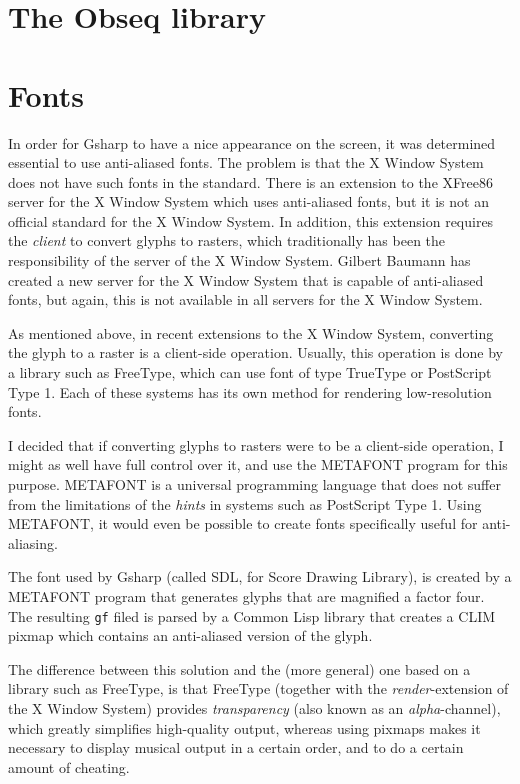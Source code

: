 \documentclass[11pt]{book}
\def\commonlisp{Common Lisp}
\def\gs{Gsharp}
\def\obseq{Obseq}
\def\clim{CLIM}
\def\xwin{the X Window System}
\def\freetype{FreeType}
\def\metafont{METAFONT}
\begin{document}
\chapter{The {\obseq} library}

\chapter{Fonts}
\label{chap-fonts}

In order for {\gs} to have a nice appearance on the screen, it was
determined essential to use anti-aliased fonts.  The problem is that
{\xwin} does not have such fonts in the standard.  There is an
extension to the XFree86 server for {\xwin} which uses anti-aliased
fonts, but it is not an official standard for {\xwin}.  In addition,
this extension requires the \emph{client} to convert glyphs to
rasters, which traditionally has been the responsibility of the server
of {\xwin}.  Gilbert Baumann has created a new server for {\xwin} that
is capable of anti-aliased fonts, but again, this is not available in
all servers for {\xwin}.

As mentioned above, in recent extensions to {\xwin}, converting the
glyph to a raster is a client-side operation.  Usually, this operation
is done by a library such as {\freetype}, which can use font of type
TrueType or PostScript Type 1.  Each of these systems has its own
method for rendering low-resolution fonts.  

I decided that if converting glyphs to rasters were to be a
client-side operation, I might as well have full control over it, and
use the {\metafont} program for this purpose.  {\metafont} is a
universal programming language that does not suffer from the
limitations of the \emph{hints} in systems such as
PostScript Type 1.  Using {\metafont}, it would even be possible to
create fonts specifically useful for anti-aliasing.

The font used by {\gs} (called SDL, for Score Drawing Library), is
created by a {\metafont} program that generates glyphs that are
magnified a factor four.  The resulting \texttt{gf} filed is parsed by
a {\commonlisp} library that creates a {\clim} pixmap which contains an
anti-aliased version of the glyph.  

The difference between this solution and the (more general) one based
on a library such as {\freetype}, is that {\freetype} (together with
the \emph{render}-extension of {\xwin}) provides \emph{transparency}
(also known as an \emph{alpha}-channel), which greatly simplifies
high-quality output, whereas using pixmaps makes it necessary to
display musical output in a certain order, and to do a certain amount
of cheating.
\end{document}
